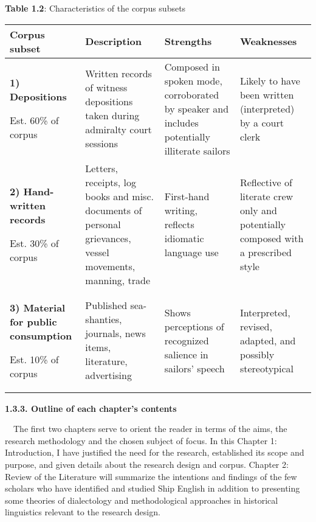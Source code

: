 \begin{styleNormali}
\textbf{Table 1.2}: Characteristics of the corpus subsets 
\end{styleNormali}

\begin{flushleft}
\tablefirsthead{}
\tablehead{}
\tabletail{}
\tablelasttail{}
\begin{supertabular}{m{1.2851598in}m{1.4052598in}m{1.5948598in}m{1.2983599in}}
\hline
\textbf{Corpus subset} &
\textbf{Description} &
\textbf{Strengths} &
\textbf{Weaknesses}\\\hline
\textbf{1) Depositions}

Est. 60\% of corpus &
Written records of witness depositions taken during admiralty court sessions &
Composed in spoken mode, corroborated by speaker and includes potentially illiterate sailors &
Likely to have been written (interpreted) by a court clerk\\
\textbf{2) Hand-written records}

Est. 30\% of corpus &
Letters, receipts, log books and misc. documents of personal grievances, vessel movements, manning, trade  &
First-hand writing, reflects idiomatic language use  &
Reflective of literate crew only and potentially composed with a prescribed style\\
\textbf{3) Material for public consumption}

Est. 10\% of corpus &
Published sea-shanties, journals, news items, literature, advertising  &
Shows perceptions of recognized salience in sailors’ speech  &
Interpreted, revised, adapted, and possibly stereotypical \\\hline
\end{supertabular}
\end{flushleft}
\begin{styleNormali}
\textbf{1.3.3. Outline of each chapter’s contents}
\end{styleNormali}

\begin{styleNormali}
\ \ The first two chapters serve to orient the reader in terms of the aims, the research methodology and the chosen subject of focus. In this Chapter 1: Introduction, I have justified the need for the research, established its scope and purpose, and given details about the research design and corpus. Chapter 2: Review of the Literature will summarize the intentions and findings of the few scholars who have identified and studied Ship English in addition to presenting some theories of dialectology and methodological approaches in historical linguistics relevant to the research design. 
\end{styleNormali}

